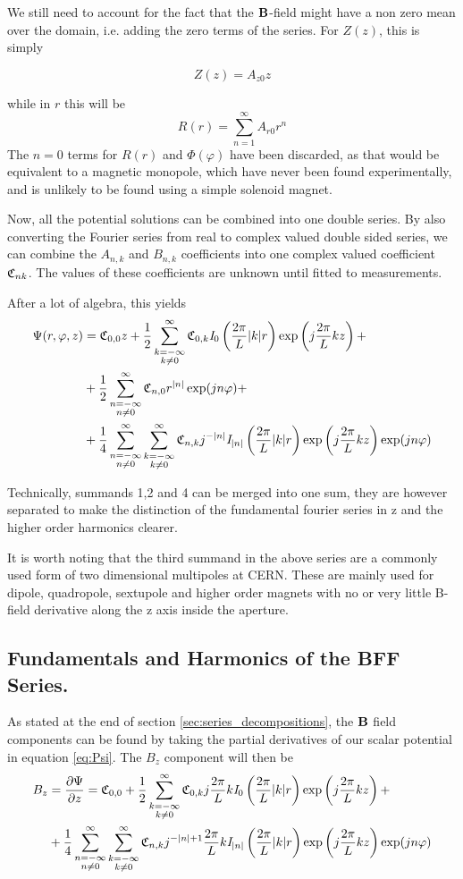 We still need to account for the fact that the $\vb{B}$-field might have
a non zero mean over the domain, i.e. adding the zero terms of the series.
For $Z(z)$, this is simply

\begin{equation}
    Z(z) = A_{z0}z
\end{equation}

while in $r$ this will be
\begin{equation}
    R(r) = \sum\limits_{n=1}^{\infty} A_{r0}r^n
\end{equation}
\cite[pp.12-14]{moon_field_1988}
The $n=0$ terms for $R(r)$ and $\varPhi(\varphi)$ have been discarded,
as that would be equivalent to a magnetic monopole, which have never
been found experimentally, and is unlikely to be found using a simple
solenoid magnet.\cite{Acharya2022}

Now, all the potential solutions can be combined into one double
series. By also converting the Fourier series from real to complex
valued double sided series, we can combine the $A_{n,k}$ and $B_{n,k}$
coefficients into one complex valued coefficient $\Cnk$. The values
of these coefficients are unknown until fitted to measurements.

After a lot of algebra, this yields
\begin{equation} \label{eq:Psi}
    \begin{split}
        \Psi(r,\varphi,z) &=\Cnk[0,0]z + \Bffok +\\
        &+ \Bffno +\\ &+ \Bffnk
    \end{split}
\end{equation}

Technically, summands 1,2 and 4 can be merged into one sum,
they are however separated to make the distinction of the
fundamental fourier series in z and the higher order
harmonics clearer.

It is worth noting that the third summand in the above series
are a commonly used form of two dimensional multipoles at CERN.
These are mainly used for dipole, quadropole, sextupole and 
higher order magnets with no or very little B-field 
derivative along the z axis inside the aperture.
\cite[Ch.6.1]{russenschuck_field_2011}

\subsection{Fundamentals and Harmonics of the BFF Series.}
As stated at the end of section \ref{sec:series_decompositions},
the $\vb{B}$ field components can be found by taking
the partial derivatives of our scalar potential in
equation \ref{eq:Psi}.
The $B_z$ component will then be
\begin{equation}
    \begin{split}
        B_z &= \frac{\partial \Psi}{\partial z} =
        \Cnk[0,0] + \Bffzok +\\
        &+ \Bffznk
    \end{split}
\end{equation}


